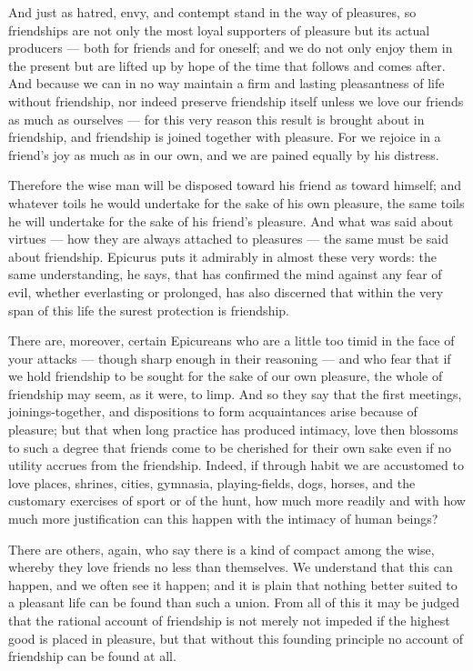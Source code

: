  And just as hatred, envy, and contempt stand in the way of pleasures, so friendships are not only the most loyal supporters of pleasure but its actual producers — both for friends and for oneself; and we do not only enjoy them in the present but are lifted up by hope of the time that follows and comes after. And because we can in no way maintain a firm and lasting pleasantness of life without friendship, nor indeed preserve friendship itself unless we love our friends as much as ourselves — for this very reason this result is brought about in friendship, and friendship is joined together with pleasure. For we rejoice in a friend's joy as much as in our own, and we are pained equally by his distress.

 Therefore the wise man will be disposed toward his friend as toward himself; and whatever toils he would undertake for the sake of his own pleasure, the same toils he will undertake for the sake of his friend's pleasure. And what was said about virtues — how they are always attached to pleasures — the same must be said about friendship. Epicurus puts it admirably in almost these very words: the same understanding, he says, that has confirmed the mind against any fear of evil, whether everlasting or prolonged, has also discerned that within the very span of this life the surest protection is friendship.

 There are, moreover, certain Epicureans who are a little too timid in the face of your attacks — though sharp enough in their reasoning — and who fear that if we hold friendship to be sought for the sake of our own pleasure, the whole of friendship may seem, as it were, to limp. And so they say that the first meetings, joinings-together, and dispositions to form acquaintances arise because of pleasure; but that when long practice has produced intimacy, love then blossoms to such a degree that friends come to be cherished for their own sake even if no utility accrues from the friendship. Indeed, if through habit we are accustomed to love places, shrines, cities, gymnasia, playing-fields, dogs, horses, and the customary exercises of sport or of the hunt, how much more readily and with how much more justification can this happen with the intimacy of human beings?

 There are others, again, who say there is a kind of compact among the wise, whereby they love friends no less than themselves. We understand that this can happen, and we often see it happen; and it is plain that nothing better suited to a pleasant life can be found than such a union. From all of this it may be judged that the rational account of friendship is not merely not impeded if the highest good is placed in pleasure, but that without this founding principle no account of friendship can be found at all.

